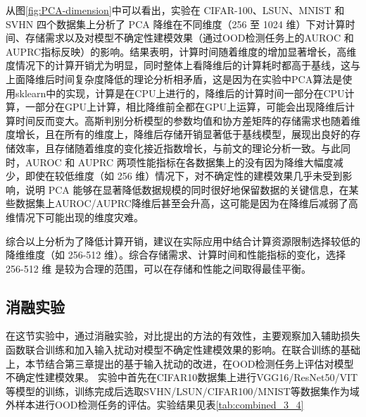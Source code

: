 从图\ref{fig:PCA-dimension}中可以看出，实验在 CIFAR-100、LSUN、MNIST 和 SVHN 四个数据集上分析了 PCA 降维在不同维度（256 至 1024 维）下对计算时间、存储需求以及对模型不确定性建模效果（通过OOD检测任务上的AUROC 和 AUPRC指标反映）的影响。结果表明，计算时间随着维度的增加显著增长，高维度情况下的计算开销尤为明显，同时整体上看降维后的计算耗时都高于基线，这与上面降维后时间复杂度降低的理论分析相矛盾，这是因为在实验中PCA算法是使用sklearn中的实现，计算是在CPU上进行的，降维后的计算时间一部分在CPU计算，一部分在GPU上计算，相比降维前全都在GPU上运算，可能会出现降维后计算时间反而变大。高斯判别分析模型的参数均值和协方差矩阵的存储需求也随着维度增长，且在所有的维度上，降维后存储开销显著低于基线模型，展现出良好的存储效率，且存储随着维度的变化接近指数增长，与前文的理论分析一致。与此同时，AUROC 和 AUPRC 两项性能指标在各数据集上的没有因为降维大幅度减少，即使在较低维度（如 256 维）情况下，对不确定性的建模效果几乎未受到影响，说明 PCA 能够在显著降低数据规模的同时很好地保留数据的关键信息，在某些数据集上AUROC/AUPRC降维后甚至会升高，这可能是因为在降维后减弱了高维情况下可能出现的维度灾难。

综合以上分析为了降低计算开销，建议在实际应用中结合计算资源限制选择较低的降维维度（如 256-512 维）。综合存储需求、计算时间和性能指标的变化，选择 256-512 维 是较为合理的范围，可以在存储和性能之间取得最佳平衡。

\subsection{消融实验}
在这节实验中，通过消融实验，对比提出的方法的有效性，主要观察加入辅助损失函数联合训练和加入输入扰动对模型不确定性建模效果的影响。在联合训练的基础上，本节结合第三章提出的基于输入扰动的改进，在OOD检测任务上评估对模型不确定性建模效果。
实验中首先在CIFAR10数据集上进行VGG16/ResNet50/VIT等模型的训练，训练完成后选取SVHN/LSUN/CIFAR100/MNIST等数据集作为域外样本进行OOD检测任务的评估。实验结果见表\ref{tab:combined_3_4}



